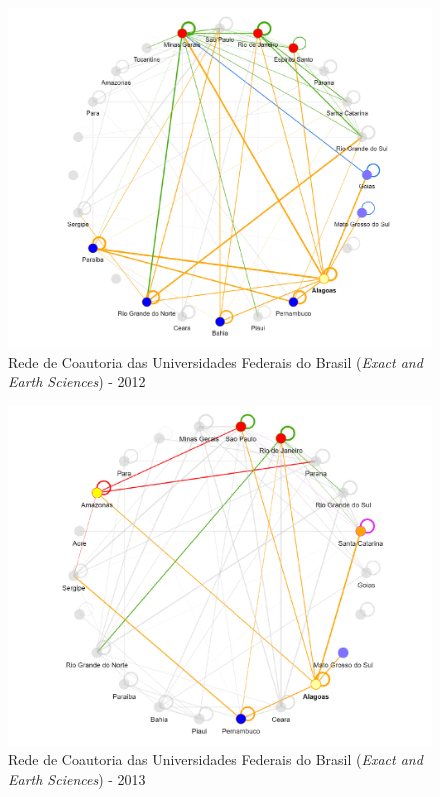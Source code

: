 \begin{figure}[H]
	\centering
	\includegraphics[scale=0.6]{Imagens/rede-exact-AL-2012.pdf}
	\caption{Rede de Coautoria das Universidades Federais do Brasil (\textit{Exact and Earth Sciences}) - 2012}
	\label{Rede de Coautoria - UF EXACT AL 2012}
\end{figure}

\begin{figure}[H]
	\centering
	\includegraphics[scale=0.6]{Imagens/rede-exact-AL-2013.pdf}
	\caption{Rede de Coautoria das Universidades Federais do Brasil (\textit{Exact and Earth Sciences}) - 2013}
	\label{Rede de Coautoria - UF EXACT AL 2013}
\end{figure}

